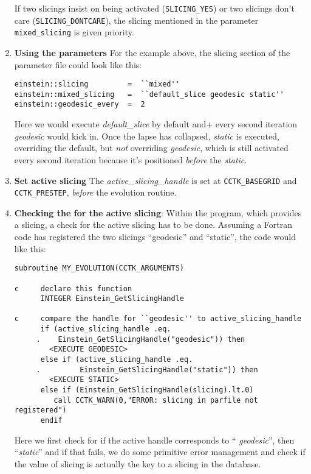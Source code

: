 \documentclass{article}
\begin{document}
\begin{enumerate}
If two slicings insist on being activated ({\tt SLICING\_YES}) or two
slicings don't care ({\tt SLICING\_DONTCARE}), the slicing mentioned in
the parameter {\tt mixed\_slicing} is given priority. 

\item{\bf Using the parameters}
For the example above, the slicing section of the parameter file could 
look like this:
\begin{verbatim}
einstein::slicing         =  ``mixed''
einstein::mixed_slicing   =  ``default_slice geodesic static''
einstein::geodesic_every  =  2
\end{verbatim}
Here we would execute {\em default\_slice} by default and+ every second
iteration {\em geodesic} would kick in. Once the lapse has collapsed,
{\em static} is executed, overriding the default, but {\em not}
overriding {\em geodesic}, which is still activated every second
iteration because it's positioned {\em before} the {\em static}.

\item{\bf Set active slicing} The {\em active\_slicing\_handle} is set
at {\tt CCTK\_BASEGRID} and {\tt CCTK\_PRESTEP}, {\em before} the
evolution routine.

\item{\bf Checking the for the active slicing}: Within the program,
which provides a slicing, a check for the active slicing has to be
done. Assuming a Fortran code has registered the two slicings
``geodesic'' and ``static'', the code would like this:
\begin{verbatim}
subroutine MY_EVOLUTION(CCTK_ARGUMENTS)

c     declare this function
      INTEGER Einstein_GetSlicingHandle

c     compare the handle for ``geodesic'' to active_slicing_handle
      if (active_slicing_handle .eq. 
     .    Einstein_GetSlicingHandle("geodesic")) then
        <EXECUTE GEODESIC>
      else if (active_slicing_handle .eq. 
     .         Einstein_GetSlicingHandle("static")) then
        <EXECUTE STATIC>
      else if (Einstein_GetSlicingHandle(slicing).lt.0)
         call CCTK_WARN(0,"ERROR: slicing in parfile not registered")
      endif
\end{verbatim}
Here we first check for if the active handle corresponds to ``{\em
geodesic}'', then ``{\em static}'' and if that fails, we do some
primitive error management and check if the value of slicing is
actually the key to a slicing in the database.

\end{enumerate}







\end{document}
